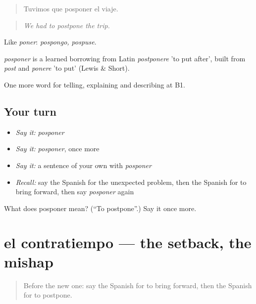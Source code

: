 \begin{quote}
Tuvimos que posponer el viaje.
\end{quote}

\begin{quote}
\emph{We had to postpone the trip.}
\end{quote}

Like \emph{poner}: \emph{pospongo, pospuse}.

\begin{cousinweb}
\emph{posponer} is a learned borrowing from Latin \emph{postponere} 'to put after', built from \emph{post} and \emph{ponere} 'to put' (Lewis \& Short).
\end{cousinweb}

\begin{grammarlens}[title={What you've built}]
One more word for telling, explaining and describing at B1.
\end{grammarlens}

\subsection*{Your turn}
\begin{itemize}
\raggedright
  \item \emph{Say it:} \emph{posponer}
  \item \emph{Say it:} \emph{posponer}, once more
  \item \emph{Say it:} a sentence of your own with \emph{posponer}
  \item \emph{Recall:} say the Spanish for the unexpected problem, then the Spanish for to bring forward, then say \emph{posponer} again
\end{itemize}

\begin{tcolorbox}[breakable,colback=teal!4,colframe=teal!35!black,title={Before you move on}]
What does posponer mean? (\textquotedblleft{}To postpone\textquotedblright{}.) Say it once more.
\end{tcolorbox}
\section[el contratiempo]{el contratiempo — the setback, the mishap}

\label{lesson:ES-C616-contratiempo}



\begin{quote}
Before the new one: say the Spanish for to bring forward, then the Spanish for to postpone.
\end{quote}

